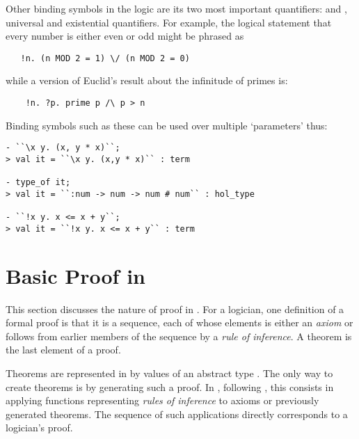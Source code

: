 Other binding symbols in the logic are its two most important quantifiers: \ml{!} and , universal and existential quantifiers.
For example, the logical statement that every number is either even or odd might be phrased as
\begin{verbatim}
   !n. (n MOD 2 = 1) \/ (n MOD 2 = 0)
\end{verbatim}
while a version of Euclid's result about the infinitude of primes is:
\begin{verbatim}
    !n. ?p. prime p /\ p > n
\end{verbatim}
%
Binding symbols such as these can be used over multiple `parameters' thus:
\begin{session}
\begin{verbatim}
- ``\x y. (x, y * x)``;
> val it = ``\x y. (x,y * x)`` : term

- type_of it;
> val it = ``:num -> num -> num # num`` : hol_type

- ``!x y. x <= x + y``;
> val it = ``!x y. x <= x + y`` : term
\end{verbatim}
\end{session}


\section{Basic Proof in \HOL{}}

\newcommand\tacticline{\hline \hline}
\newenvironment{proofenumerate}{\begin{enumerate}}{\end{enumerate}}

\setcounter{sessioncount}{0}

This section discusses the nature of proof in \HOL{}.
For a logician, one definition of a formal proof is that it is a sequence, each of whose elements is either an \emph{axiom} or follows from earlier members of the sequence by a \emph{rule of inference}.
A theorem is the last element of a proof.

Theorems are represented in \HOL{} by values of an abstract type .
The only way to create theorems is by generating such a proof.
In \HOL, following \LCF, this consists in applying \ML{} functions representing \emph{rules of inference} to axioms or previously generated theorems.
The sequence of such applications directly corresponds to a logician's proof.

